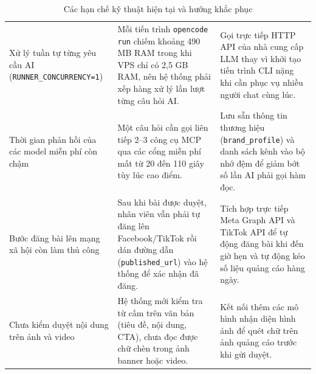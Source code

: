 \begin{table}[!htbp]
\centering
\footnotesize
\renewcommand{\arraystretch}{1.04}
\caption{Các hạn chế kỹ thuật hiện tại và hướng khắc phục}
\label{tab:known-limitations}
\begin{tabularx}{\textwidth}{|L{3.1cm}|Y|Y|}
\hline
{} &  & \\
\hline
Xử lý tuần tự từng yêu cầu AI (\texttt{RUNNER\_}\allowbreak\texttt{CONCURRENCY=1}) & Mỗi tiến trình \texttt{opencode run} chiếm khoảng 490 MB RAM trong khi VPS chỉ có 2,5 GB RAM, nên hệ thống phải xếp hàng xử lý lần lượt từng câu hỏi AI. & Gọi trực tiếp HTTP API của nhà cung cấp LLM thay vì khởi tạo tiến trình CLI nặng khi cần phục vụ nhiều người chat cùng lúc.\\
\hline
Thời gian phản hồi của các model miễn phí còn chậm & Một câu hỏi cần gọi liên tiếp 2--3 công cụ MCP qua các cổng miễn phí mất từ 20 đến 110 giây tùy lúc cao điểm. & Lưu sẵn thông tin thương hiệu (\texttt{brand\_profile}) và danh sách kênh vào bộ nhớ đệm để giảm bớt số lần AI phải gọi hàm đọc.\\
\hline
Bước đăng bài lên mạng xã hội còn làm thủ công & Sau khi bài được duyệt, nhân viên vẫn phải tự đăng lên Facebook/TikTok rồi dán đường dẫn (\texttt{published\_url}) vào hệ thống để xác nhận đã đăng. & Tích hợp trực tiếp Meta Graph API và TikTok API để tự động đăng bài khi đến giờ hẹn và tự động kéo số liệu quảng cáo hàng ngày.\\
\hline
Chưa kiểm duyệt nội dung trên ảnh và video & Hệ thống mới kiểm tra từ cấm trên văn bản (tiêu đề, nội dung, CTA), chưa đọc được chữ chèn trong ảnh banner hoặc video. & Kết nối thêm các mô hình nhận diện hình ảnh để quét chữ trên ảnh quảng cáo trước khi gửi duyệt.\\
\hline
\end{tabularx}
\end{table}
